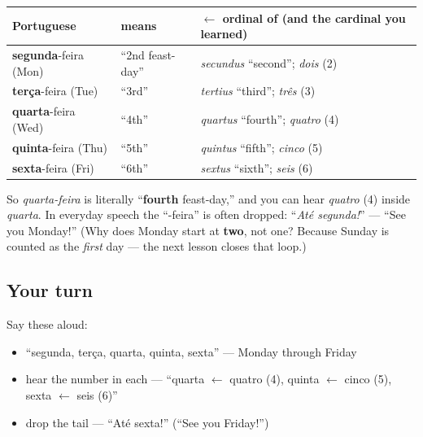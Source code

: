 \begin{grammarlens}[title={Grammar Lens: The pattern: {[}ordinal{]} + feira}]
\noindent
\begin{tabularx}{\linewidth}{@{}>{\raggedright\arraybackslash}X>{\raggedright\arraybackslash}X>{\raggedright\arraybackslash}X@{}}
\toprule
\textbf{Portuguese} & \textbf{means} & \textbf{$\leftarrow$ ordinal of (and the cardinal you learned)} \\
\midrule
\textbf{segunda}-feira (Mon) & \textquotedblleft{}2nd feast-day\textquotedblright{} & \emph{secundus} \textquotedblleft{}second\textquotedblright{}; \emph{dois} (2) \\
\textbf{terça}-feira (Tue) & \textquotedblleft{}3rd\textquotedblright{} & \emph{tertius} \textquotedblleft{}third\textquotedblright{}; \emph{três} (3) \\
\textbf{quarta}-feira (Wed) & \textquotedblleft{}4th\textquotedblright{} & \emph{quartus} \textquotedblleft{}fourth\textquotedblright{}; \emph{quatro} (4) \\
\textbf{quinta}-feira (Thu) & \textquotedblleft{}5th\textquotedblright{} & \emph{quintus} \textquotedblleft{}fifth\textquotedblright{}; \emph{cinco} (5) \\
\textbf{sexta}-feira (Fri) & \textquotedblleft{}6th\textquotedblright{} & \emph{sextus} \textquotedblleft{}sixth\textquotedblright{}; \emph{seis} (6) \\
\bottomrule
\end{tabularx}

So \emph{quarta-feira} is literally \textquotedblleft{}\textbf{fourth} feast-day,\textquotedblright{} and you can hear \emph{quatro} (4) inside \emph{quarta}. In everyday speech the \textquotedblleft{}-feira\textquotedblright{} is often dropped: \textquotedblleft{}\emph{Até segunda!}\textquotedblright{} — \textquotedblleft{}See you Monday!\textquotedblright{} (Why does Monday start at \textbf{two}, not one? Because Sunday is counted as the \emph{first} day — the next lesson closes that loop.)
\end{grammarlens}

\subsection*{Your turn}
Say these aloud:

\begin{itemize}
\raggedright
  \item \textquotedblleft{}segunda, terça, quarta, quinta, sexta\textquotedblright{} — Monday through Friday
  \item hear the number in each — \textquotedblleft{}quarta $\leftarrow$ quatro (4), quinta $\leftarrow$ cinco (5), sexta $\leftarrow$ seis (6)\textquotedblright{}
  \item drop the tail — \textquotedblleft{}Até sexta!\textquotedblright{} (\textquotedblleft{}See you Friday!\textquotedblright{})
\end{itemize}

